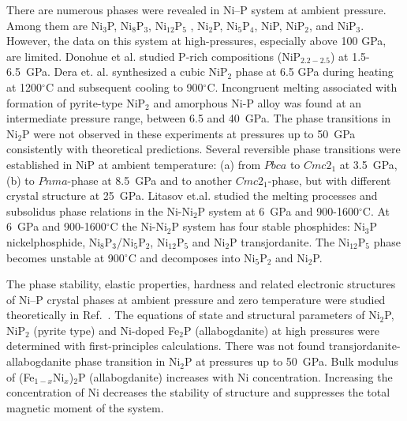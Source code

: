 \documentclass[twoside,twocolumn,9pt]{article}
\begin{document}
There are numerous phases were revealed in Ni--P system at ambient pressure. 
Among them are Ni$_3$P, Ni$_8$P$_3$, Ni$_{12}$P$_5$ , Ni$_2$P, Ni$_5$P$_4$, NiP, NiP$_2$, and NiP$_3$. 
However, the data on this system at high-pressures, especially above 100 GPa, are limited.
Donohue et al.\cite{Donohue-1968} studied P-rich compositions (NiP$_{2.2-2.5}$) at 1.5-6.5~GPa.
Dera et. al.\cite{Dera-2009-JGR} synthesized a cubic NiP$_2$ phase at 6.5 GPa during heating at 1200$^\circ$C and subsequent cooling to 900$^\circ$C. 
Incongruent melting associated with formation of pyrite-type NiP$_2$ and amorphous Ni-P alloy was found at an intermediate pressure range, between 6.5 and 40~GPa.
The phase transitions in Ni$_2$P were not observed in these experiments at pressures up to 50~GPa consistently with theoretical predictions.\cite{Nisar-2010-EPSL}
Several reversible phase transitions were established in NiP at ambient temperature: (a) from $Pbca$ to $Cmc2_1$ at 3.5~GPa, (b) to $Pnma$-phase at 8.5~GPa and to another $Cmc2_1$-phase, but with different crystal structure at 25~GPa.\cite{Dera-2011-JSSC, Dera2013-PCM}
{\color{blue}
Litasov et.al. studied the melting processes and subsolidus phase relations in the Ni-Ni$_2$P system at 6~GPa and 900-1600$^\circ$C. 
At 6~GPa and 900-1600$^\circ$C the Ni-Ni$_2$P system has four stable phosphides: Ni$_3$P nickelphosphide, Ni$_8$P$_3$/Ni$_5$P$_2$, Ni$_{12}$P$_5$ and Ni$_2$P transjordanite.  
The Ni$_{12}$P$_5$ phase becomes unstable at 900$^\circ$C and decomposes into Ni$_5$P$_2$ and Ni$_2$P. 
~\cite{Litasov-2019-HPR-NiP}
}

The phase stability, elastic properties, hardness and related electronic structures of Ni--P crystal phases at ambient pressure and zero temperature were studied theoretically in Ref.~\cite{Chen-2016-PhaseTrans, Zhao2011-CALPHAD}. 
The equations of state and structural parameters of Ni$_2$P, NiP$_2$ (pyrite type) and Ni-doped Fe$_2$P (allabogdanite) at high pressures were determined with first-principles calculations.\cite{Nisar-2010-EPSL}
There was not found transjordanite-allabogdanite phase transition in Ni$_2$P at pressures up to 50~GPa. 
Bulk modulus of (Fe$_{1-x}$Ni$_x$)$_2$P (allabogdanite) increases with Ni concentration. 
Increasing the concentration of Ni decreases the stability of structure and suppresses the total magnetic moment of the system. 
\end{document}
